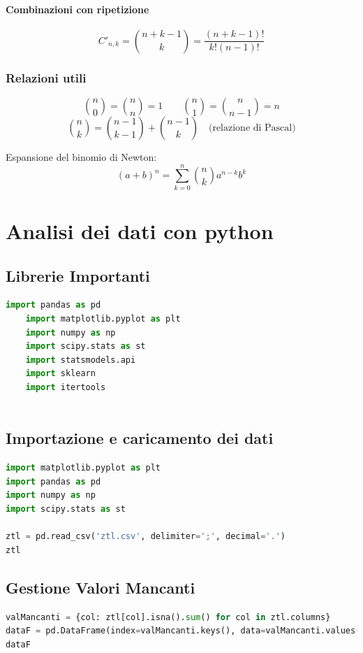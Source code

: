 \documentclass{article}
\begin{document}
\paragraph{Combinazioni con ripetizione}
\[
C'_{n,k} = \binom{n+k-1}{k} = \frac{(n+k-1)!}{k!(n-1)!}
\]

\subsubsection{Relazioni utili}
\[
\binom{n}{0} = \binom{n}{n} = 1 \quad \quad \binom{n}{1} = \binom{n}{n-1} = n
\]
\[
\binom{n}{k} = \binom{n-1}{k-1} + \binom{n-1}{k} \quad \text{(relazione di Pascal)}
\]

Espansione del binomio di Newton:
\[
(a + b)^n = \sum_{k=0}^{n} \binom{n}{k} a^{n-k} b^k
\]

\section{Analisi dei dati con python}

\subsection*{Librerie Importanti}

\begin{lstlisting}[language=Python]
    import pandas as pd
    import matplotlib.pyplot as plt
    import numpy as np
    import scipy.stats as st
    import statsmodels.api
    import sklearn
    import itertools
    
\end{lstlisting}
\subsection*{Importazione e caricamento dei dati}

\begin{lstlisting}[language=Python]
import matplotlib.pyplot as plt
import pandas as pd
import numpy as np
import scipy.stats as st

ztl = pd.read_csv('ztl.csv', delimiter=';', decimal='.')
ztl
\end{lstlisting}

\subsection*{Gestione Valori Mancanti}

\begin{lstlisting}[language=Python]
valMancanti = {col: ztl[col].isna().sum() for col in ztl.columns}
dataF = pd.DataFrame(index=valMancanti.keys(), data=valMancanti.values(), columns=['Valori Mancanti'])
dataF
\end{lstlisting}
\end{document}
